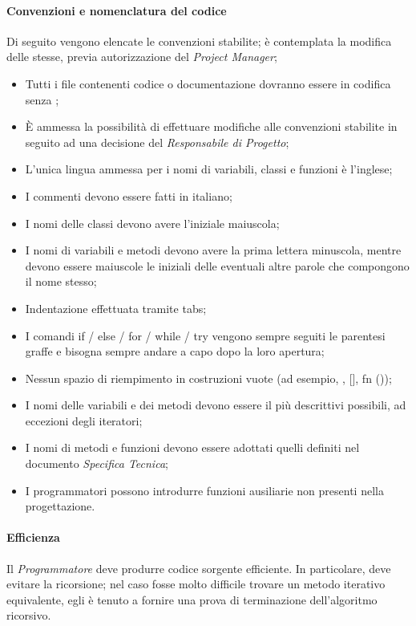    \paragraph{Convenzioni e nomenclatura del codice}
   Di seguito vengono elencate le convenzioni stabilite; è contemplata la modifica delle stesse, previa autorizzazione del \emph{Project Manager};
\begin{itemize}
\item Tutti i file contenenti codice o documentazione dovranno essere in codifica  senza ;
\item È ammessa la possibilità di effettuare modifiche alle convenzioni stabilite in seguito ad una decisione del \emph{Responsabile di Progetto};
\item L'unica lingua ammessa per i nomi di variabili, classi e funzioni è l'inglese;
\item I commenti devono essere fatti in italiano;
\item I nomi delle classi devono avere l’iniziale maiuscola;
\item I nomi di variabili e metodi devono avere la prima lettera minuscola, mentre devono essere maiuscole le iniziali delle eventuali altre parole che compongono il nome stesso;
\item Indentazione effettuata tramite tabs;
\item I comandi if / else / for / while / try vengono sempre seguiti le parentesi graffe e bisogna sempre andare a capo dopo la loro apertura;
\item Nessun spazio di riempimento in costruzioni vuote (ad esempio, {}, [], fn ());
\item I nomi delle variabili e dei metodi devono essere il più descrittivi possibili, ad eccezioni degli iteratori;
\item I nomi di metodi e funzioni devono essere adottati quelli definiti nel documento \emph{Specifica Tecnica};
\item I programmatori possono introdurre funzioni ausiliarie non presenti nella progettazione.
\end{itemize}
	\paragraph{Efficienza}
	Il \textit{Programmatore} deve produrre codice sorgente efficiente. In particolare, deve evitare la ricorsione; nel caso fosse molto difficile trovare un metodo iterativo equivalente, egli è tenuto a fornire una prova di terminazione dell’algoritmo ricorsivo.

